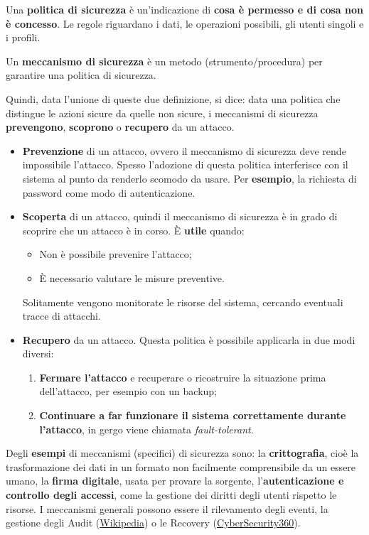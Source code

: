 \documentclass[a4paper]{article}
\begin{document}
	Una \textcolor{Red3}{\textbf{politica di sicurezza}} è un'indicazione di \textbf{cosa è permesso e di cosa non è concesso}. Le regole riguardano i dati, le operazioni possibili, gli utenti singoli e i profili.\newline
	
	\noindent
	Un \textcolor{Red3}{\textbf{meccanismo di sicurezza}} è un metodo (strumento/procedura) per garantire una politica di sicurezza.\newline
	
	\noindent
	Quindi, data l'unione di queste due definizione, si dice: data una politica che distingue le azioni sicure da quelle non sicure, i meccanismi di sicurezza \textbf{prevengono}, \textbf{scoprono} o \textbf{recupero} da un attacco.
	\begin{itemize}
		\item \textbf{Prevenzione} di un attacco, ovvero il meccanismo di sicurezza deve rende impossibile l'attacco. Spesso l'adozione di questa politica interferisce con il sistema al punto da renderlo scomodo da usare. Per \textcolor{Green4}{\textbf{esempio}}, la richiesta di password come modo di autenticazione.
		
		\item \textbf{Scoperta} di un attacco, quindi il meccanismo di sicurezza è in grado di scoprire che un attacco è in corso. È \textbf{utile} quando:
		\begin{itemize}
			\item Non è possibile prevenire l'attacco;
			\item È necessario valutare le misure preventive.
		\end{itemize}
		Solitamente vengono monitorate le risorse del sistema, cercando eventuali tracce di attacchi.
		
		\item \textbf{Recupero} da un attacco. Questa politica è possibile applicarla in due modi diversi:
		\begin{enumerate}
			\item \textbf{Fermare l'attacco} e recuperare o ricostruire la situazione prima dell'attacco, per esempio con un backup;
			
			\item \textbf{Continuare a far funzionare il sistema correttamente durante l'attacco}, in gergo viene chiamata \emph{fault-tolerant}.
		\end{enumerate}
	\end{itemize}
	Degli \textcolor{Green4}{\textbf{esempi}} di meccanismi (specifici) di sicurezza sono: la \textbf{crittografia}, cioè la trasformazione dei dati in un formato non facilmente comprensibile da un essere umano, la \textbf{firma digitale}, usata per provare la sorgente, l'\textbf{autenticazione e controllo degli accessi}, come la gestione dei diritti degli utenti rispetto le risorse. I meccanismi generali possono essere il rilevamento degli eventi, la gestione degli Audit (\href{https://it.wikipedia.org/wiki/Audit}{Wikipedia}) o le Recovery (\href{https://www.cybersecurity360.it/soluzioni-aziendali/cyber-event-recovery-strutturare-un-piano-dazione-per-ripristinare-dati-sistemi-e-servizi/}{CyberSecurity360}).\newpage
	
\end{document}
